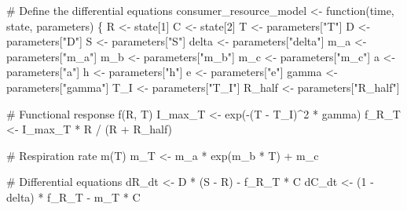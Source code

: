 \documentclass[
  letterpaper,
  DIV=11,
  numbers=noendperiod]{scrartcl}
\newenvironment{Shaded}{\begin{snugshade}}{\end{snugshade}}
\newcommand{\CommentTok}[1]{\textcolor[rgb]{0.37,0.37,0.37}{#1}}
\newcommand{\ControlFlowTok}[1]{\textcolor[rgb]{0.00,0.23,0.31}{#1}}
\newcommand{\DecValTok}[1]{\textcolor[rgb]{0.68,0.00,0.00}{#1}}
\newcommand{\FunctionTok}[1]{\textcolor[rgb]{0.28,0.35,0.67}{#1}}
\newcommand{\NormalTok}[1]{\textcolor[rgb]{0.00,0.23,0.31}{#1}}
\newcommand{\OtherTok}[1]{\textcolor[rgb]{0.00,0.23,0.31}{#1}}
\newcommand{\SpecialCharTok}[1]{\textcolor[rgb]{0.37,0.37,0.37}{#1}}
\newcommand{\StringTok}[1]{\textcolor[rgb]{0.13,0.47,0.30}{#1}}
\begin{document}
\begin{Shaded}
\begin{Highlighting}[]
\CommentTok{\# Define the differential equations}
\NormalTok{consumer\_resource\_model }\OtherTok{\textless{}{-}} \ControlFlowTok{function}\NormalTok{(time, state, parameters) \{}
\NormalTok{    R }\OtherTok{\textless{}{-}}\NormalTok{ state[}\DecValTok{1}\NormalTok{]}
\NormalTok{    C }\OtherTok{\textless{}{-}}\NormalTok{ state[}\DecValTok{2}\NormalTok{]}
\NormalTok{    T }\OtherTok{\textless{}{-}}\NormalTok{ parameters[}\StringTok{"T"}\NormalTok{]}
\NormalTok{    D }\OtherTok{\textless{}{-}}\NormalTok{ parameters[}\StringTok{"D"}\NormalTok{]}
\NormalTok{    S }\OtherTok{\textless{}{-}}\NormalTok{ parameters[}\StringTok{"S"}\NormalTok{]}
\NormalTok{    delta }\OtherTok{\textless{}{-}}\NormalTok{ parameters[}\StringTok{"delta"}\NormalTok{]}
\NormalTok{    m\_a }\OtherTok{\textless{}{-}}\NormalTok{ parameters[}\StringTok{"m\_a"}\NormalTok{]}
\NormalTok{    m\_b }\OtherTok{\textless{}{-}}\NormalTok{ parameters[}\StringTok{"m\_b"}\NormalTok{]}
\NormalTok{    m\_c }\OtherTok{\textless{}{-}}\NormalTok{ parameters[}\StringTok{"m\_c"}\NormalTok{]}
\NormalTok{    a }\OtherTok{\textless{}{-}}\NormalTok{ parameters[}\StringTok{"a"}\NormalTok{]}
\NormalTok{    h }\OtherTok{\textless{}{-}}\NormalTok{ parameters[}\StringTok{"h"}\NormalTok{]}
\NormalTok{    e }\OtherTok{\textless{}{-}}\NormalTok{ parameters[}\StringTok{"e"}\NormalTok{]}
\NormalTok{    gamma }\OtherTok{\textless{}{-}}\NormalTok{ parameters[}\StringTok{"gamma"}\NormalTok{]}
\NormalTok{    T\_I }\OtherTok{\textless{}{-}}\NormalTok{ parameters[}\StringTok{"T\_I"}\NormalTok{]}
\NormalTok{    R\_half }\OtherTok{\textless{}{-}}\NormalTok{ parameters[}\StringTok{"R\_half"}\NormalTok{]}

    \CommentTok{\# Functional response f(R, T)}
\NormalTok{    I\_max\_T }\OtherTok{\textless{}{-}} \FunctionTok{exp}\NormalTok{(}\SpecialCharTok{{-}}\NormalTok{(T }\SpecialCharTok{{-}}\NormalTok{ T\_I)}\SpecialCharTok{\^{}}\DecValTok{2} \SpecialCharTok{*}\NormalTok{ gamma)}
\NormalTok{    f\_R\_T }\OtherTok{\textless{}{-}}\NormalTok{ I\_max\_T }\SpecialCharTok{*}\NormalTok{ R }\SpecialCharTok{/}\NormalTok{ (R }\SpecialCharTok{+}\NormalTok{ R\_half)}

    \CommentTok{\# Respiration rate m(T)}
\NormalTok{    m\_T }\OtherTok{\textless{}{-}}\NormalTok{ m\_a }\SpecialCharTok{*} \FunctionTok{exp}\NormalTok{(m\_b }\SpecialCharTok{*}\NormalTok{ T) }\SpecialCharTok{+}\NormalTok{ m\_c}

    \CommentTok{\# Differential equations}
\NormalTok{    dR\_dt }\OtherTok{\textless{}{-}}\NormalTok{ D }\SpecialCharTok{*}\NormalTok{ (S }\SpecialCharTok{{-}}\NormalTok{ R) }\SpecialCharTok{{-}}\NormalTok{ f\_R\_T }\SpecialCharTok{*}\NormalTok{ C}
\NormalTok{    dC\_dt }\OtherTok{\textless{}{-}}\NormalTok{ (}\DecValTok{1} \SpecialCharTok{{-}}\NormalTok{ delta) }\SpecialCharTok{*}\NormalTok{ f\_R\_T }\SpecialCharTok{{-}}\NormalTok{ m\_T }\SpecialCharTok{*}\NormalTok{ C}


\end{Highlighting}
\end{Shaded}
\end{document}

